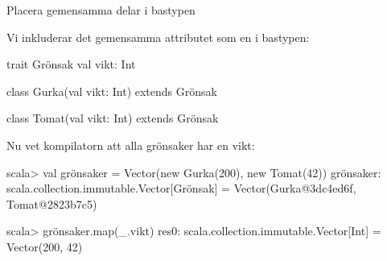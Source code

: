 \begin{Slide}{Placera gemensamma delar i bastypen}

Vi inkluderar det gemensamma attributet  som en  i bastypen:

\begin{Code}
trait Grönsak { val vikt: Int }

class Gurka(val vikt: Int) extends Grönsak

class Tomat(val vikt: Int) extends Grönsak
\end{Code}
Nu vet kompilatorn att alla grönsaker har en vikt:
\begin{REPL}
scala> val grönsaker = Vector(new Gurka(200), new Tomat(42))
grönsaker: scala.collection.immutable.Vector[Grönsak] =
  Vector(Gurka@3dc4ed6f, Tomat@2823b7c5)

scala> grönsaker.map(_.vikt)
res0: scala.collection.immutable.Vector[Int] = Vector(200, 42)
\end{REPL}

\end{Slide}





